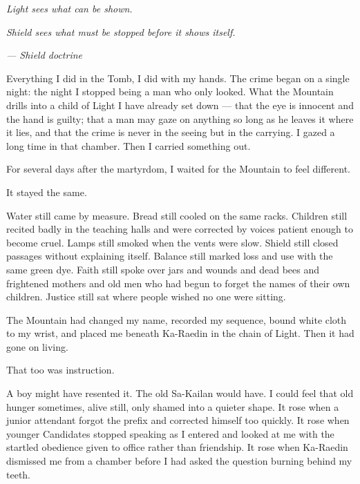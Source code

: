 
\textit{Light sees what can be shown.}\par
\textit{Shield sees what must be stopped before it shows itself.}\par
\textit{--- Shield doctrine}\par

\ornament

Everything I did in the Tomb, I did with my hands. The crime began on a single night: the night I stopped being a man who only looked. What the Mountain drills into a child of Light I have already set down --- that the eye is innocent and the hand is guilty; that a man may gaze on anything so long as he leaves it where it lies, and that the crime is never in the seeing but in the carrying. I gazed a long time in that chamber. Then I carried something out.\par

\ornament

For several days after the martyrdom, I waited for the Mountain to feel different.\par

It stayed the same.\par

Water still came by measure.
Bread still cooled on the same racks.
Children still recited badly in the teaching halls and were corrected by voices patient enough to become cruel.
Lamps still smoked when the vents were slow.
Shield still closed passages without explaining itself.
Balance still marked loss and use with the same green dye.
Faith still spoke over jars and wounds and dead bees and frightened mothers and old men who had begun to forget the names of their own children.
Justice still sat where people wished no one were sitting.\par

The Mountain had changed my name, recorded my sequence, bound white cloth to my wrist, and placed me beneath Ka-Raedin in the chain of Light.
Then it had gone on living.\par

That too was instruction.\par

A boy might have resented it. The old Sa-Kailan would have. I could feel that old hunger sometimes, alive still, only shamed into a quieter shape. It rose when a junior attendant forgot the prefix and corrected himself too quickly. It rose when younger Candidates stopped speaking as I entered and looked at me with the startled obedience given to office rather than friendship. It rose when Ka-Raedin dismissed me from a chamber before I had asked the question burning behind my teeth.\par

